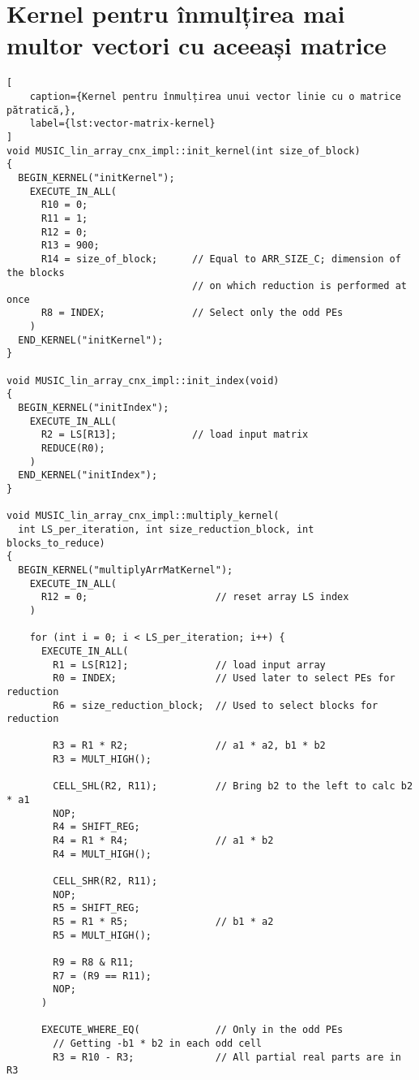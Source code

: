 \section{Kernel pentru înmulțirea mai multor vectori cu aceeași matrice}
\label{sec:kernel-mult-arr-mat}
\begin{lstlisting}[
    caption={Kernel pentru înmulțirea unui vector linie cu o matrice pătratică,},
    label={lst:vector-matrix-kernel}
]
void MUSIC_lin_array_cnx_impl::init_kernel(int size_of_block)
{
  BEGIN_KERNEL("initKernel");
    EXECUTE_IN_ALL(
      R10 = 0;
      R11 = 1;
      R12 = 0;
      R13 = 900;
      R14 = size_of_block;      // Equal to ARR_SIZE_C; dimension of the blocks
                                // on which reduction is performed at once
      R8 = INDEX;               // Select only the odd PEs
    )
  END_KERNEL("initKernel");
}

void MUSIC_lin_array_cnx_impl::init_index(void)
{
  BEGIN_KERNEL("initIndex");
    EXECUTE_IN_ALL(
      R2 = LS[R13];             // load input matrix
      REDUCE(R0);
    )
  END_KERNEL("initIndex");
}

void MUSIC_lin_array_cnx_impl::multiply_kernel(
  int LS_per_iteration, int size_reduction_block, int blocks_to_reduce)
{
  BEGIN_KERNEL("multiplyArrMatKernel");
    EXECUTE_IN_ALL(
      R12 = 0;                      // reset array LS index
    )

    for (int i = 0; i < LS_per_iteration; i++) {
      EXECUTE_IN_ALL(
        R1 = LS[R12];               // load input array
        R0 = INDEX;                 // Used later to select PEs for reduction
        R6 = size_reduction_block;  // Used to select blocks for reduction

        R3 = R1 * R2;               // a1 * a2, b1 * b2
        R3 = MULT_HIGH();

        CELL_SHL(R2, R11);          // Bring b2 to the left to calc b2 * a1
        NOP;
        R4 = SHIFT_REG;
        R4 = R1 * R4;               // a1 * b2
        R4 = MULT_HIGH();

        CELL_SHR(R2, R11);
        NOP;
        R5 = SHIFT_REG;
        R5 = R1 * R5;               // b1 * a2
        R5 = MULT_HIGH();

        R9 = R8 & R11;
        R7 = (R9 == R11);
        NOP;
      )

      EXECUTE_WHERE_EQ(             // Only in the odd PEs
        // Getting -b1 * b2 in each odd cell
        R3 = R10 - R3;              // All partial real parts are in R3


\end{lstlisting}
